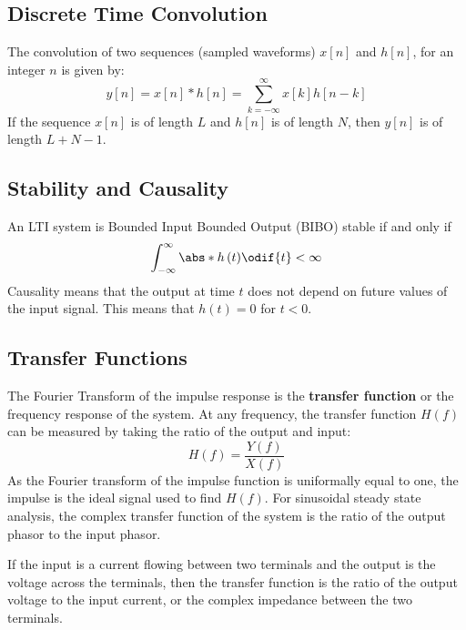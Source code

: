 \documentclass{article}
\begin{document}
\subsection{Discrete Time Convolution}
The convolution of two sequences (sampled waveforms) \(x\left[ n \right]\) and \(h\left[ n \right]\), for an integer \(n\) is given by:
\begin{equation*}
    y\left[ n \right] = x\left[ n \right] \ast h\left[ n \right] = \sum_{k = -\infty}^\infty x\left[ k \right] h\left[ n - k \right]
\end{equation*}
If the sequence \(x\left[ n \right]\) is of length \(L\) and \(h\left[ n \right]\) is of length \(N\),
then \(y\left[ n \right]\) is of length \(L + N - 1\).
\subsection{Stability and Causality}
An LTI system is Bounded Input Bounded Output (BIBO) stable if and only if
\begin{equation*}
    \int_{-\infty}^\infty \abs*{h\left( t \right)} \odif{t} < \infty
\end{equation*}
Causality means that the output at time \(t\) does not depend on future values of the input signal.
This means that \(h\left( t \right) = 0\) for \(t < 0\).
\subsection{Transfer Functions}
The Fourier Transform of the impulse response is the \textbf{transfer function} or
the frequency response of the system. At any frequency, the transfer function \(H\left( f \right)\)
can be measured by taking the ratio of the output and input:
\begin{equation*}
    H\left( f \right) = \frac{Y\left( f \right)}{X\left( f \right)}
\end{equation*}
As the Fourier transform of the impulse function is uniformally equal to one, the
impulse is the ideal signal used to find \(H\left( f \right)\).
For sinusoidal steady state analysis, the complex transfer function of the system is the ratio of the
output phasor to the input phasor.

If the input is a current flowing between two terminals and the output is the voltage across the terminals,
then the transfer function is the ratio of the output voltage to the input current, or
the complex impedance between the two terminals.
\end{document}
